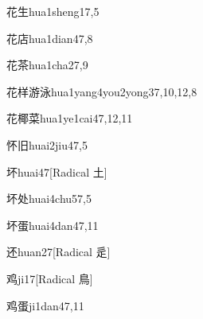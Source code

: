 \begin{verbete}{花生}{hua1sheng1}{7,5}
\end{verbete}

\begin{verbete}{花店}{hua1dian4}{7,8}
\end{verbete}

\begin{verbete}{花茶}{hua1cha2}{7,9}
\end{verbete}

\begin{verbete}{花样游泳}{hua1yang4you2yong3}{7,10,12,8}
\end{verbete}

\begin{verbete}{花椰菜}{hua1ye1cai4}{7,12,11}
\end{verbete}

\begin{verbete}{怀旧}{huai2jiu4}{7,5}
\end{verbete}

\begin{verbete}{坏}{huai4}{7}[Radical 土]
\end{verbete}

\begin{verbete}{坏处}{huai4chu5}{7,5}
\end{verbete}

\begin{verbete}{坏蛋}{huai4dan4}{7,11}
\end{verbete}

\begin{verbete}{还}{huan2}{7}[Radical 辵]
\end{verbete}

\begin{verbete}{鸡}{ji1}{7}[Radical 鳥]
\end{verbete}

\begin{verbete}{鸡蛋}{ji1dan4}{7,11}
\end{verbete}

